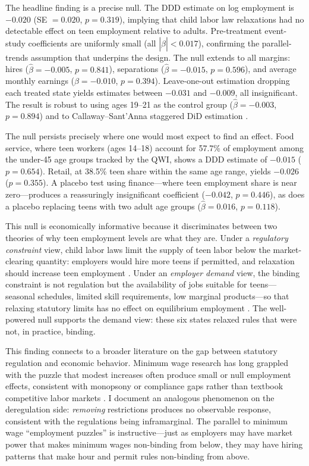 \documentclass[12pt]{article}
\begin{document}
The headline finding is a precise null. The DDD estimate on log employment is $-0.020$ (SE $= 0.020$, $p = 0.319$), implying that child labor law relaxations had no detectable effect on teen employment relative to adults. Pre-treatment event-study coefficients are uniformly small (all $|\hat{\beta}| < 0.017$), confirming the parallel-trends assumption that underpins the design. The null extends to all margins: hires ($\hat{\beta} = -0.005$, $p = 0.841$), separations ($\hat{\beta} = -0.015$, $p = 0.596$), and average monthly earnings ($\hat{\beta} = -0.010$, $p = 0.394$). Leave-one-out estimation dropping each treated state yields estimates between $-0.031$ and $-0.009$, all insignificant. The result is robust to using ages 19--21 as the control group ($\hat{\beta} = -0.003$, $p = 0.894$) and to Callaway--Sant'Anna staggered DiD estimation \citep{callaway2021difference}.

The null persists precisely where one would most expect to find an effect. Food service, where teen workers (ages 14--18) account for 57.7\% of employment among the under-45 age groups tracked by the QWI, shows a DDD estimate of $-0.015$ ($p = 0.654$). Retail, at 38.5\% teen share within the same age range, yields $-0.026$ ($p = 0.355$). A placebo test using finance---where teen employment share is near zero---produces a reassuringly insignificant coefficient ($-0.042$, $p = 0.446$), as does a placebo replacing teens with two adult age groups ($\hat{\beta} = 0.016$, $p = 0.118$).

This null is economically informative because it discriminates between two theories of why teen employment levels are what they are. Under a \textit{regulatory constraint} view, child labor laws limit the supply of teen labor below the market-clearing quantity: employers would hire more teens if permitted, and relaxation should increase teen employment \citep{basu1998economics}. Under an \textit{employer demand} view, the binding constraint is not regulation but the availability of jobs suitable for teens---seasonal schedules, limited skill requirements, low marginal products---so that relaxing statutory limits has no effect on equilibrium employment \citep{ruhm1997economic}. The well-powered null supports the demand view: these six states relaxed rules that were not, in practice, binding.

This finding connects to a broader literature on the gap between statutory regulation and economic behavior. Minimum wage research has long grappled with the puzzle that modest increases often produce small or null employment effects, consistent with monopsony or compliance gaps rather than textbook competitive labor markets \citep{card1992minimum, dube2010minimum, cengiz2019effect, harasztosi2019pays}. I document an analogous phenomenon on the deregulation side: \textit{removing} restrictions produces no observable response, consistent with the regulations being inframarginal. The parallel to minimum wage ``employment puzzles'' is instructive---just as employers may have market power that makes minimum wages non-binding from below, they may have hiring patterns that make hour and permit rules non-binding from above.
\end{document}
